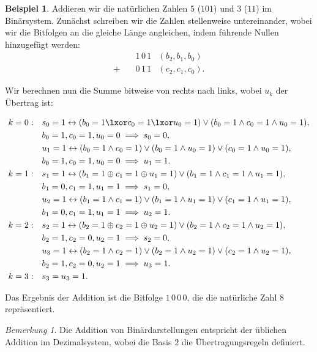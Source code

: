 \documentclass{book}
\theoremstyle{plain}
\theoremstyle{remark}
\newtheorem*{remark}{Bemerkung}
\theoremstyle{definition}
\newtheorem*{example}{Beispiel}
\begin{document}
\begin{example}
    Addieren wir die natürlichen Zahlen \( 5 \) (\(101\)) und \( 3 \) (\(11\)) im Binärsystem. Zunächst schreiben wir die Zahlen stellenweise untereinander, wobei wir die Bitfolgen an die gleiche Länge angleichen, indem führende Nullen hinzugefügt werden:
    \[
    \begin{aligned}
        & \quad 1\,0\,1 & (b_2, b_1, b_0) \\
        + & \quad 0\,1\,1 & (c_2, c_1, c_0).
    \end{aligned}
    \]

    Wir berechnen nun die Summe bitweise von rechts nach links, wobei \( u_k \) der Übertrag ist:

    \[
    \begin{aligned}
        k = 0: & \quad s_0 = 1 \leftrightarrow (b_0 = 1 \lxor c_0 = 1 \lxor u_0 = 1) \lor (b_0 = 1 \wedge c_0 = 1 \wedge u_0 = 1), \\
               & \quad b_0 = 1, c_0 = 1, u_0 = 0 \implies s_0 = 0, \\
               & \quad u_1 = 1 \leftrightarrow (b_0 = 1 \wedge c_0 = 1) \lor (b_0 = 1 \wedge u_0 = 1) \lor (c_0 = 1 \wedge u_0 = 1), \\
               & \quad b_0 = 1, c_0 = 1, u_0 = 0 \implies u_1 = 1. \\    
        k = 1: & \quad s_1 = 1 \leftrightarrow (b_1 = 1 \oplus c_1 = 1 \oplus u_1 = 1) \lor (b_1 = 1 \wedge c_1 = 1 \wedge u_1 = 1), \\
               & \quad b_1 = 0, c_1 = 1, u_1 = 1 \implies s_1 = 0, \\
               & \quad u_2 = 1 \leftrightarrow (b_1 = 1 \wedge c_1 = 1) \lor (b_1 = 1 \wedge u_1 = 1) \lor (c_1 = 1 \wedge u_1 = 1), \\
               & \quad b_1 = 0, c_1 = 1, u_1 = 1 \implies u_2 = 1. \\    
        k = 2: & \quad s_2 = 1 \leftrightarrow (b_2 = 1 \oplus c_2 = 1 \oplus u_2 = 1) \lor (b_2 = 1 \wedge c_2 = 1 \wedge u_2 = 1), \\
               & \quad b_2 = 1, c_2 = 0, u_2 = 1 \implies s_2 = 0, \\
               & \quad u_3 = 1 \leftrightarrow (b_2 = 1 \wedge c_2 = 1) \lor (b_2 = 1 \wedge u_2 = 1) \lor (c_2 = 1 \wedge u_2 = 1), \\
               & \quad b_2 = 1, c_2 = 0, u_2 = 1 \implies u_3 = 1. \\
        k = 3: & \quad s_3 = u_3 = 1.
    \end{aligned}
    \]

    Das Ergebnis der Addition ist die Bitfolge \( 1\,0\,0\,0 \), die die natürliche Zahl \( 8 \) repräsentiert.
\end{example}

\begin{remark}
    Die Addition von Binärdarstellungen entspricht der üblichen Addition im Dezimalsystem, wobei die Basis \( 2 \) die Übertragungsregeln definiert.
\end{remark}
\end{document}

